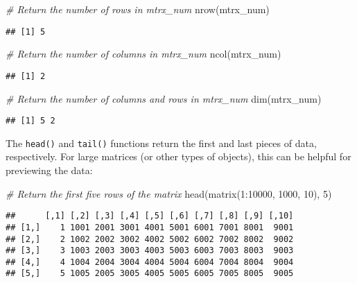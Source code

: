 \documentclass[
]{book}
\newenvironment{Shaded}{\begin{snugshade}}{\end{snugshade}}
\newcommand{\CommentTok}[1]{\textcolor[rgb]{0.56,0.35,0.01}{\textit{#1}}}
\newcommand{\DecValTok}[1]{\textcolor[rgb]{0.00,0.00,0.81}{#1}}
\newcommand{\FunctionTok}[1]{\textcolor[rgb]{0.00,0.00,0.00}{#1}}
\newcommand{\NormalTok}[1]{#1}
\newcommand{\SpecialCharTok}[1]{\textcolor[rgb]{0.00,0.00,0.00}{#1}}
\begin{document}
\begin{Shaded}
\begin{Highlighting}[]
\CommentTok{\# Return the number of rows in mtrx\_num}
\FunctionTok{nrow}\NormalTok{(mtrx\_num)}
\end{Highlighting}
\end{Shaded}

\begin{verbatim}
## [1] 5
\end{verbatim}

\begin{Shaded}
\begin{Highlighting}[]
\CommentTok{\# Return the number of columns in mtrx\_num}
\FunctionTok{ncol}\NormalTok{(mtrx\_num)}
\end{Highlighting}
\end{Shaded}

\begin{verbatim}
## [1] 2
\end{verbatim}

\begin{Shaded}
\begin{Highlighting}[]
\CommentTok{\# Return the number of columns and rows in mtrx\_num}
\FunctionTok{dim}\NormalTok{(mtrx\_num)}
\end{Highlighting}
\end{Shaded}

\begin{verbatim}
## [1] 5 2
\end{verbatim}

The \texttt{head()} and \texttt{tail()} functions return the first and last pieces of data, respectively. For large matrices (or other types of objects), this can be helpful for previewing the data:

\begin{Shaded}
\begin{Highlighting}[]
\CommentTok{\# Return the first five rows of the matrix}
\FunctionTok{head}\NormalTok{(}\FunctionTok{matrix}\NormalTok{(}\DecValTok{1}\SpecialCharTok{:}\DecValTok{10000}\NormalTok{, }\DecValTok{1000}\NormalTok{, }\DecValTok{10}\NormalTok{), }\DecValTok{5}\NormalTok{)}
\end{Highlighting}
\end{Shaded}

\begin{verbatim}
##      [,1] [,2] [,3] [,4] [,5] [,6] [,7] [,8] [,9] [,10]
## [1,]    1 1001 2001 3001 4001 5001 6001 7001 8001  9001
## [2,]    2 1002 2002 3002 4002 5002 6002 7002 8002  9002
## [3,]    3 1003 2003 3003 4003 5003 6003 7003 8003  9003
## [4,]    4 1004 2004 3004 4004 5004 6004 7004 8004  9004
## [5,]    5 1005 2005 3005 4005 5005 6005 7005 8005  9005
\end{verbatim}
\end{document}

